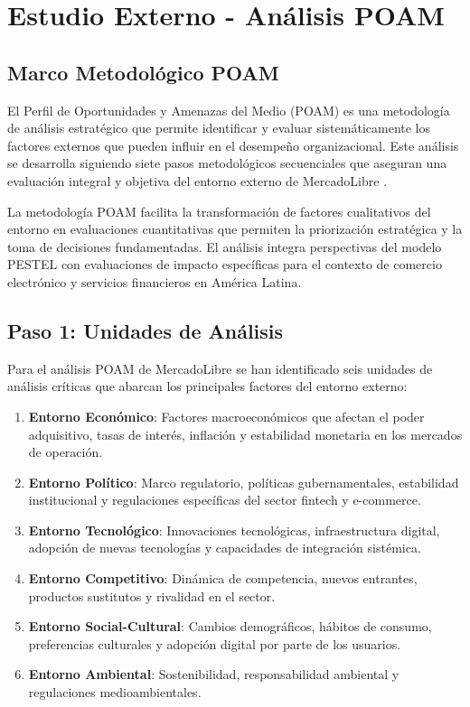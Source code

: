 \section{Estudio Externo - Análisis POAM}
\label{sec:estudio_externo}

\subsection{Marco Metodológico POAM}

El Perfil de Oportunidades y Amenazas del Medio (POAM) es una metodología de análisis estratégico que permite identificar y evaluar sistemáticamente los factores externos que pueden influir en el desempeño organizacional. Este análisis se desarrolla siguiendo siete pasos metodológicos secuenciales que aseguran una evaluación integral y objetiva del entorno externo de MercadoLibre \autocite{david2017}.

La metodología POAM facilita la transformación de factores cualitativos del entorno en evaluaciones cuantitativas que permiten la priorización estratégica y la toma de decisiones fundamentadas. El análisis integra perspectivas del modelo PESTEL con evaluaciones de impacto específicas para el contexto de comercio electrónico y servicios financieros en América Latina.

\subsection{Paso 1: Unidades de Análisis}

Para el análisis POAM de MercadoLibre se han identificado seis unidades de análisis críticas que abarcan los principales factores del entorno externo:

\begin{enumerate}
\item \textbf{Entorno Económico}: Factores macroeconómicos que afectan el poder adquisitivo, tasas de interés, inflación y estabilidad monetaria en los mercados de operación.
\item \textbf{Entorno Político}: Marco regulatorio, políticas gubernamentales, estabilidad institucional y regulaciones específicas del sector fintech y e-commerce.
\item \textbf{Entorno Tecnológico}: Innovaciones tecnológicas, infraestructura digital, adopción de nuevas tecnologías y capacidades de integración sistémica.
\item \textbf{Entorno Competitivo}: Dinámica de competencia, nuevos entrantes, productos sustitutos y rivalidad en el sector.
\item \textbf{Entorno Social-Cultural}: Cambios demográficos, hábitos de consumo, preferencias culturales y adopción digital por parte de los usuarios.
\item \textbf{Entorno Ambiental}: Sostenibilidad, responsabilidad ambiental y regulaciones medioambientales.
\end{enumerate}

